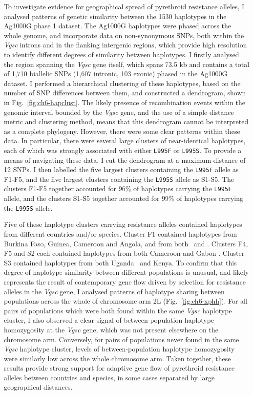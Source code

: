 \begin{refsection}
To investigate evidence for geographical spread of pyrethroid resistance alleles, I analysed patterns of genetic similarity between the 1530 haplotypes in the Ag1000G phase 1 dataset.
%
The Ag1000G haplotypes were phased across the whole genome, and incorporate data on non-synonymous SNPs, both within the \textit{Vgsc} introns and in the flanking intergenic regions, which provide high resolution to identify different degrees of similarity between haplotypes.
%
I firstly analysed the region spanning the \textit{Vgsc} gene itself, which spans 73.5 kb and contains a total of 1,710 biallelic SNPs (1,607 intronic, 103 exonic) phased in the Ag1000G dataset.
%
I performed a hierarchical clustering of these haplotypes, based on the number of SNP differences between them, and constructed a dendrogram, shown in Fig.~\ref{fig:ch6-hapclust}.
%
The likely presence of recombination events within the genomic interval bounded by the \textit{Vgsc} gene, and the use of a simple distance metric and clustering method, means that this dendrogram cannot be interpreted as a complete phylogeny.
%
However, there were some clear patterns within these data.
%
In particular, there were several large clusters of near-identical haplotypes, each of which was strongly associated with either \texttt{L995F} or \texttt{L995S}.
%
To provide a means of navigating these data, I cut the dendrogram at a maximum distance of 12 SNPs.
%
I then labelled the five largest clusters containing the \texttt{L995F} allele as F1-F5, and the five largest clusters containing the \texttt{L995S} allele as S1-S5.
%
The clusters F1-F5 together accounted for 96\% of haplotypes carrying the \texttt{L995F} allele, and the clusters S1-S5 together accounted for 99\% of haplotypes carrying the \texttt{L995S} allele.


Five of these haplotype clusters carrying resistance alleles contained haplotypes from different countries and/or species.
%
Cluster F1 contained haplotypes from Burkina Faso, Guinea, Cameroon and Angola, and from both \agam\ and \acol.
%
Clusters F4, F5 and S2 each contained haplotypes from both Cameroon and Gabon \agam.
%
Cluster S3 contained haplotypes from both Uganda \agam\ and Kenya.
%
To confirm that this degree of haplotype similarity between different populations is unusual, and likely represents the result of contemporary gene flow driven by selection for resistance alleles in the \textit{Vgsc} gene, I analysed patterns of haplotype sharing between populations across the whole of chromosome arm 2L (Fig.~\ref{fig:ch6-xphh}).
%
For all pairs of populations which were both found within the same \textit{Vgsc} haplotype cluster, I also observed a clear signal of between-population haplotype homozygosity at the \textit{Vgsc} gene, which was not present elsewhere on the chromosome arm.
%
Conversely, for pairs of populations never found in the same \textit{Vgsc} haplotype cluster, levels of between-population haplotype homozygosity were similarly low across the whole chromosome arm.
%
Taken together, these results provide strong support for adaptive gene flow of pyrethroid resistance alleles between countries and species, in some cases separated by large geographical distances.



\end{refsection}
